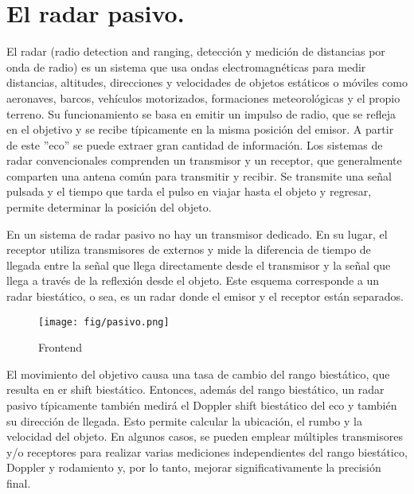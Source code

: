 \section{El radar pasivo.}


El radar (radio detection  and ranging, detección y medición de distancias por onda de radio) es un sistema que usa ondas electromagnéticas para medir distancias, altitudes, direcciones y velocidades de objetos estáticos o móviles como aeronaves, barcos, vehículos motorizados, formaciones meteorológicas y el propio terreno. 
Su funcionamiento se basa en emitir un impulso de radio, que se refleja en el objetivo y se recibe típicamente en la misma posición del emisor. 
A partir de este ''eco'' se puede extraer gran cantidad de información. 
Los sistemas de radar convencionales comprenden un transmisor y un receptor, que generalmente comparten una antena común para transmitir y recibir. 
Se transmite una señal pulsada y el tiempo que tarda el pulso en viajar hasta el objeto y regresar, permite determinar la posición del objeto.

En un sistema de radar pasivo no hay un transmisor dedicado. En su lugar, el receptor utiliza transmisores de externos y mide la diferencia de tiempo de llegada entre la señal que llega directamente desde el transmisor y la señal que llega a través de la reflexión desde el objeto. 
Este esquema corresponde a un radar biestático, o sea,  es un radar donde el emisor y el receptor están separados.

\begin{figure}[h!]
\centering
\texttt{[image: fig/pasivo.png]}
\caption{Frontend}
\label{fig:Radar pasivo}
\end{figure}


El movimiento del objetivo causa una tasa de cambio del rango biestático, que resulta en er shift biestático. Entonces, además del rango biestático, un radar pasivo típicamente también medirá el Doppler shift biestático del eco y también su dirección de llegada. 
Esto permite calcular la ubicación, el rumbo y la velocidad del objeto. En algunos casos, se pueden emplear múltiples transmisores y/o receptores para realizar varias mediciones independientes del rango biestático, Doppler y rodamiento y, por lo tanto, mejorar significativamente la precisión final.



